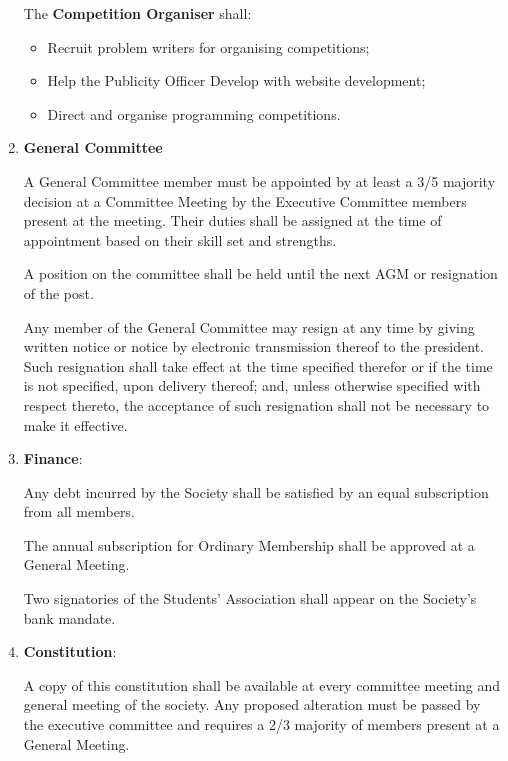 \documentclass[11pt]{article}
\begin{document}
\begin{enumerate}[label = \Roman*.]
The \textbf{Competition Organiser} shall:
\begin{itemize}
\item Recruit problem writers for organising competitions;
\item Help the Publicity Officer Develop with website development;
\item Direct and organise programming competitions.
\end{itemize}

\item \textbf{General Committee}

A General Committee member must be appointed by at least a 3/5 majority decision at a Committee Meeting by the Executive Committee members present at the meeting. Their duties shall be assigned at the time of appointment based on their skill set and strengths. 

A position on the committee shall be held until the next AGM or resignation of the post. 

Any member of the General Committee may resign at any time by giving written notice or notice by electronic transmission thereof to the president. Such resignation shall take effect at the time specified therefor or if the time is not specified, upon delivery thereof; and, unless otherwise specified with respect thereto, the acceptance of such resignation shall not be necessary to make it effective.

\item \textbf{Finance}:

Any debt incurred by the Society shall be satisfied by an equal subscription from all members.

The annual subscription for Ordinary Membership shall be approved at a General Meeting.

Two signatories of the Students' Association shall appear on the Society's bank mandate.

\item \textbf{Constitution}: 

A copy of this constitution shall be available at every committee meeting and general meeting of the society. Any proposed alteration must be passed by the executive committee and requires a 2/3 majority of members present at a General Meeting. 

\end{enumerate}
\end{document}
